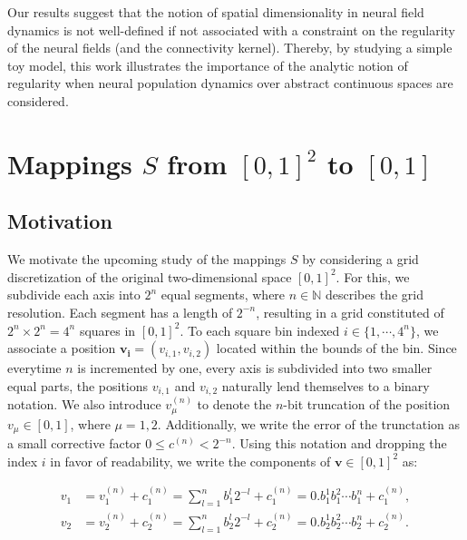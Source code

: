 \documentclass[10pt,letterpaper]{article}
\renewcommand{\vec}[1]{\boldsymbol{#1}}
\begin{document}



Our results suggest that the notion of spatial dimensionality in neural field dynamics is not well-defined if not associated with a constraint on the regularity of the neural fields (and the connectivity kernel). Thereby, by studying a simple toy model, this work illustrates the importance of the analytic notion of regularity when neural population dynamics over abstract continuous spaces are considered. 

\section{Mappings $S$ from $[0,1]^2$ to $[0,1]$}

\subsection{Motivation}

We motivate the upcoming study of the mappings $S$ by considering a grid discretization of the original two-dimensional space $[0,1]^2$. For this, we subdivide each axis into $2^n$ equal segments, where $n \in \mathbb{N}$ describes the grid resolution. Each segment has a length of $2^{-n}$, resulting in a grid constituted of $2^n \times 2^n = 4^n$ squares in $[0,1]^2$. To each square bin indexed $i \in \{1,\cdots,4^n\}$, we associate a position $\vec{v_i} = (v_{i,1}, v_{i,2})$ located within the bounds of the bin. Since everytime $n$ is incremented by one, every axis is subdivided into two smaller equal parts, the positions $v_{i,1}$ and $v_{i,2}$ naturally lend themselves to a binary notation. We also introduce $v_\mu^{(n)}$ to denote the $n$-bit truncation of the position $v_\mu \in [0,1]$, where $\mu = 1,2$. Additionally, we write the error of the trunctation as a small corrective factor $0 \leq c^{(n)} < 2^{-n}$. Using this notation and dropping the index $i$ in favor of readability, we write the components of $\vec{v} \in [0,1]^2$ as:

\begin{equation} \begin{aligned} \label{eq:positions-v}
v_1 &= v_1^{(n)} + c_1^{(n)} = \sum_{l=1}^n b_1^l 2^{-l} + c_1^{(n)} = 0.b_1^1 b_1^2 \cdots b_1^n + c_1^{(n)}, \\
v_2 &= v_2^{(n)} + c_2^{(n)} = \sum_{l=1}^n b_2^l 2^{-l} + c_2^{(n)} = 0.b_2^1 b_2^2 \cdots b_2^n + c_2^{(n)}.
\end{aligned}\end{equation}
\end{document}
